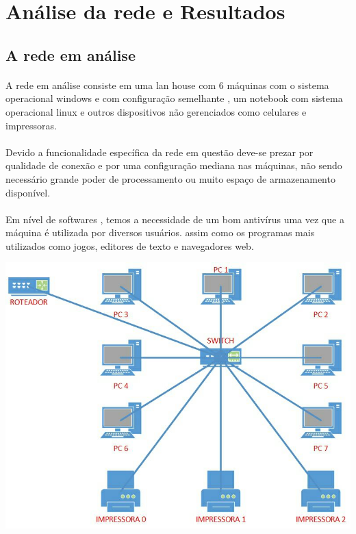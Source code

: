 \documentclass[a4paper]{article}
\begin{document}
  
  \section{Análise da rede e Resultados}
  	 
  
  \subsection{A rede em análise}
  \paragraph{}
    A rede em análise consiste em uma lan house com 6 máquinas com o sistema operacional windows e com configuração semelhante , um notebook com sistema operacional linux  e outros dispositivos não gerenciados como celulares e impressoras.
  \paragraph{}
     Devido a funcionalidade específica da rede em questão deve-se prezar por qualidade de conexão e por uma configuração mediana nas máquinas, não sendo necessário grande poder de processamento ou muito espaço de armazenamento disponível.
  \paragraph{}
    Em nível de softwares , temos a necessidade de um bom antivírus uma vez que a máquina é utilizada por diversos usuários. assim como os programas mais utilizados como jogos, editores de texto e navegadores web.
    
  \includegraphics[scale = 0.55]{topologia.jpg}\\
\end{document}

